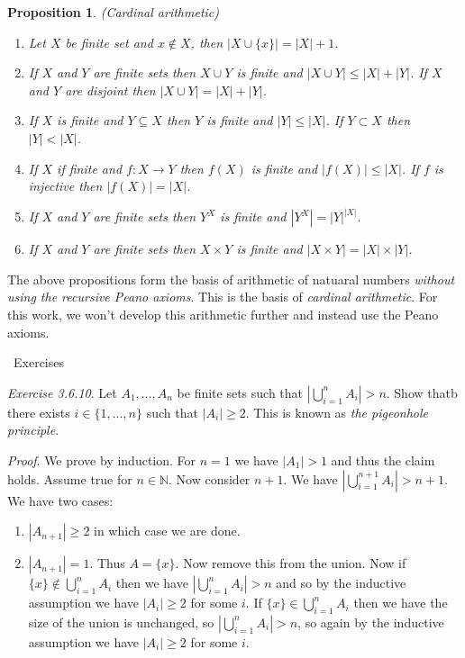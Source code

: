 \documentclass{article}
\newtheorem{proposition}{Proposition}[subsection]
\newcommand{\N}{\mathbb{N}}
\newcommand{\exercisesline}{	%
    \begin{center}
    \textemdash\ Exercises\ \textemdash
    \end{center}
}
\let\it\textit
\begin{document}
\begin{proposition}
	(Cardinal arithmetic)
	\begin{enumerate}[label=(\alph*)]
		\item Let $X$ be finite set and $x \not \in X$, then
			$|X \cup \{x\}| = |X| + 1$.
		\item If $X$ and $Y$ are finite sets then $X \cup Y$ 
			is finite and $|X \cup Y| \leq |X| + |Y|$. 
			If $X$ and $Y$ are disjoint then $|X \cup Y| = |X| + |Y|$.
		\item If $X$ is finite and $Y \subseteq X$ then $Y$ is finite
			and $|Y| \leq |X|$. If $Y \subset X$ then $|Y| < |X|$.
		\item If $X$ if finite and $f : X \to Y$ then $f(X)$ is finite 
			and $|f(X)| \leq |X|$. If $f$ is injective then
			$|f(X)| = |X|$.
		\item If $X$ and $Y$ are finite sets then $Y^X$ is 
			finite and $|Y^X| = |Y|^{|X|}$.
		\item If $X$ and $Y$ are finite sets then $X \times Y$ is finite
			and $|X \times Y| = |X| \times |Y|$.
	\end{enumerate}
\end{proposition}

The above propositions form the basis of arithmetic of natuaral numbers 
\it{without using the recursive Peano axioms}. This is the basis 
of \it{cardinal arithmetic}. For this work, we won't develop this 
arithmetic further and instead use the Peano axioms.

\exercisesline

\it{Exercise 3.6.10}. Let $A_1,\dots,A_n$ be finite sets such 
that $|\bigcup_{i=1}^n A_i|  > n$. Show thatb there exists 
$i \in \{1,...,n\}$  such that $|A_i| \geq 2$. This is known as 
\it{the pigeonhole principle}.

\it{Proof}. We prove by induction. For $n=1$ we have $|A_1| > 1$ 
and thus the claim holds. Assume true for $n \in \N$. Now consider 
$n +1$. We have $|\bigcup_{i=1}^{n+1} A_i| > n+1$. We have two cases: 
\begin{enumerate}
	\item $|A_{n+1}| \geq 2$ in which case we are done.
	\item $|A_{n+1}| = 1$. Thus $A = \{x\}$. Now remove this from 
		the union. Now if $\{x\} \not \in \bigcup_{i=1}^n A_i$ then 
		we have $|\bigcup_{i=1}^n A_i| > n$ and so by the inductive
		assumption we have $|A_i| \geq 2$ for some $i$. If
		$\{x\} \in \bigcup_{i=1}^n A_i$ then we have the size
		of the union is unchanged, so $|\bigcup_{i=1}^n A_i| > n$, 
		so again by the inductive assumption we have $|A_i| \geq 2$
		for some $i$.
\end{enumerate}
\end{document}
